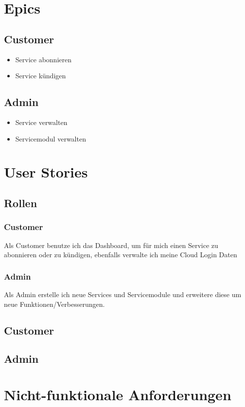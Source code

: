 \documentclass[11pt]{scrartcl}
\begin{document}
\newpage



\newpage

\newpage
\section{Epics}
\subsection{Customer}
\begin{itemize}
  \item Service abonnieren
  \item Service kündigen
\end{itemize}
\subsection{Admin}
\begin{itemize}
  \item Service verwalten
  \item Servicemodul verwalten
\end{itemize}
\section{User Stories}
\subsection{Rollen}
\subsubsection{Customer}
Als Customer benutze ich das Dashboard, um für mich einen Service zu abonnieren oder zu 
kündigen, ebenfalls verwalte ich meine Cloud Login Daten
\subsubsection{Admin}
Als Admin erstelle ich neue Services und Servicemodule und erweitere diese um 
neue Funktionen/Verbesserungen.
\subsection{Customer}





 
  
 \subsection{Admin}
 
 
 
 

\newpage

\section{Nicht-funktionale Anforderungen}


\end{document}
